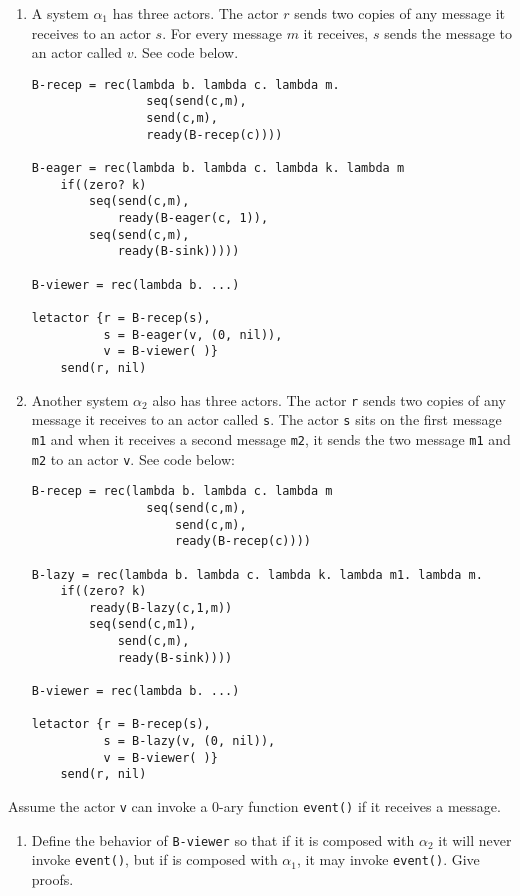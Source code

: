 \documentclass{article}
\begin{document}
\begin{enumerate}
\begin{enumerate}
\item A system $\alpha_1$ has three actors. The actor $r$ sends two copies of
any message it receives to an actor $s$. For every message $m$ it receives,
$s$ sends the message to an actor called $v$. See code below.
\begin{verbatim}
B-recep = rec(lambda b. lambda c. lambda m.
                seq(send(c,m),
                send(c,m),
                ready(B-recep(c))))

B-eager = rec(lambda b. lambda c. lambda k. lambda m
    if((zero? k)
        seq(send(c,m),
            ready(B-eager(c, 1)),
        seq(send(c,m),
            ready(B-sink)))))

B-viewer = rec(lambda b. ...)

letactor {r = B-recep(s),
          s = B-eager(v, (0, nil)),
          v = B-viewer( )}
    send(r, nil)
\end{verbatim}

\item Another system $\alpha_2$ also has three actors. The actor \texttt{r}
sends two copies of any message it receives to an actor called \texttt{s}. The
actor \texttt{s} sits on the first message \texttt{m1} and when it receives a
second message \texttt{m2}, it sends the two message \texttt{m1} and \texttt{m2}
to an actor \texttt{v}. See code below:
\begin{verbatim}
B-recep = rec(lambda b. lambda c. lambda m
                seq(send(c,m),
                    send(c,m),
                    ready(B-recep(c))))

B-lazy = rec(lambda b. lambda c. lambda k. lambda m1. lambda m.
    if((zero? k)
        ready(B-lazy(c,1,m))
        seq(send(c,m1),
            send(c,m),
            ready(B-sink))))

B-viewer = rec(lambda b. ...)

letactor {r = B-recep(s),
          s = B-lazy(v, (0, nil)),
          v = B-viewer( )}
    send(r, nil)
\end{verbatim}
\end{enumerate}

Assume the actor \texttt{v} can invoke a 0-ary function \texttt{event()} if it
receives a message.
\begin{enumerate}
\item Define the behavior of \texttt{B-viewer} so that if it is composed with
$\alpha_2$ it will never invoke \texttt{event()}, but if is composed with
$\alpha_1$, it may invoke \texttt{event()}. Give proofs.


\end{enumerate}
\end{enumerate}
\end{document}

